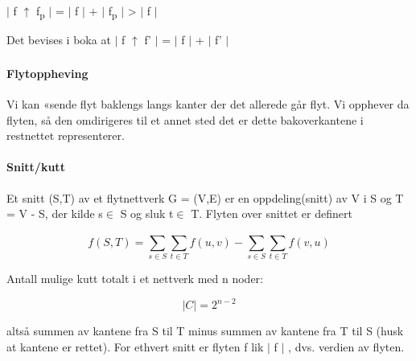 \documentclass[12pt]{report}
\begin{document}
\begin{Center}
$ \vert $  f $ \uparrow $  f\textsubscript{p} $ \vert $  = $ \vert $  f $ \vert $  + $ \vert $  f\textsubscript{p} $ \vert $  > $ \vert $  f $ \vert $ 
\end{Center}\par

Det bevises i boka at $ \vert $  f $ \uparrow $  f’ $ \vert $  = $ \vert $  f $ \vert $  + $ \vert $  f’\textsubscript{ }$ \vert $ \par


\vspace{\baselineskip}
\paragraph*{Flytoppheving}
Vi kan «sende flyt baklengs langs kanter der det allerede går flyt. Vi opphever da flyten, så den omdirigeres til et annet sted  det er dette bakoverkantene i restnettet representerer.\par


\vspace{\baselineskip}
\paragraph*{Snitt/kutt}
Et snitt (S,T) av et flytnettverk G = (V,E) er en oppdeling(snitt) av V i S og T = V - S, der kilde s$ \in $ S og sluk t$ \in $ T. Flyten over snittet er definert \par

\begin{Center}
 \[ f \left( S, T \right) =  \sum _{s \in S}^{} \sum _{t \in T}^{}f \left( u, v \right) -  \sum _{s \in S}^{} \sum _{t \in T}^{}f \left( v, u \right)  \] 
\end{Center}\par

\setlength{\parskip}{10.56pt}
Antall mulige kutt totalt i et nettverk med n noder:\par

\begin{Center}
 \[  \vert C \vert =2^{n-2} \] 
\end{Center}\par


\vspace{\baselineskip}
altså summen av kantene fra S til T minus summen av kantene fra T til S (husk at kantene er rettet). For ethvert snitt er flyten f lik $ \vert $  f $ \vert $ , dvs. verdien av flyten. \par
\end{document}

